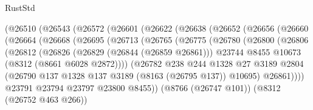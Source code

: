 \begin{lexlean}{RustStd}
\begin{coremodule}
                  (@26510
                    (@26543
                      (@26572
                        (@26601
                          (@26622
                            (@26638
                              (@26652
                                (@26656
                                  (@26660
                                    (@26664
                                      (@26668
                                        (@26695
                                          (@26713
                                            (@26765
                                              (@26775
                                                (@26780
                                                  (@26800
                                                    (@26806
                                                      (@26812
                                                        (@26826
                                                          (@26829 (@26844 (@26859 @26861)))
                                                          @23744
                                                          @8455
                                                          @10673
                                                          (@8312 (@8661 @6028 @2872))))
                                                      (@26782
                                                        @238
                                                        @244
                                                        @1328
                                                        @27
                                                        @3189
                                                        @2804
                                                        (@26790
                                                          @137
                                                          @1328
                                                          @137
                                                          @3189
                                                          (@8163 (@26795 @137))
                                                          @10695)
                                                        @26861))))
                                                @23791
                                                @23794
                                                @23797
                                                @23800
                                                @8455))
                                            (@8766 (@26747 @101))
                                            (@8312 (@26752 @463 @266))

\end{coremodule}
\end{lexlean}

